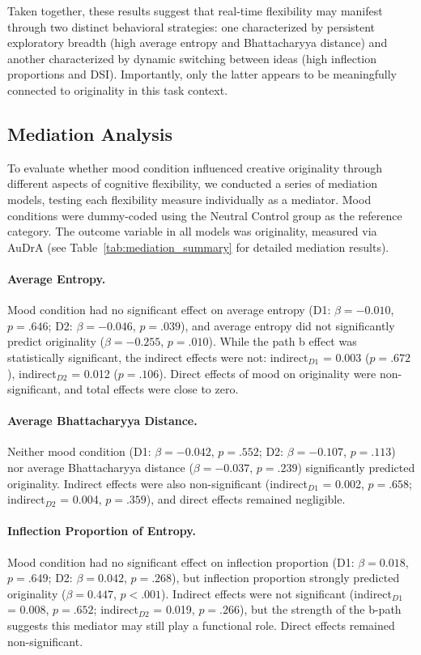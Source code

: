 \documentclass[../MA_Thesis.tex]{subfiles}
\begin{document}
Taken together, these results suggest that real-time flexibility may manifest through two distinct behavioral strategies: one characterized by persistent exploratory breadth (high average entropy and Bhattacharyya distance) and another characterized by dynamic switching between ideas (high inflection proportions and DSI). Importantly, only the latter appears to be meaningfully connected to originality in this task context.

\subsection*{Mediation Analysis}

To evaluate whether mood condition influenced creative originality through different aspects of cognitive flexibility, we conducted a series of mediation models, testing each flexibility measure individually as a mediator. Mood conditions were dummy-coded using the Neutral Control group as the reference category. The outcome variable in all models was originality, measured via AuDrA (see Table~\ref{tab:mediation_summary} for detailed mediation results).

\paragraph{Average Entropy.}
Mood condition had no significant effect on average entropy (D1: $\beta = -0.010$, $p = .646$; D2: $\beta = -0.046$, $p = .039$), and average entropy did not significantly predict originality ($\beta = -0.255$, $p = .010$). While the path b effect was statistically significant, the indirect effects were not: indirect$_{D1}$ = 0.003 ($p = .672$), indirect$_{D2}$ = 0.012 ($p = .106$). Direct effects of mood on originality were non-significant, and total effects were close to zero.

\paragraph{Average Bhattacharyya Distance.}
Neither mood condition (D1: $\beta = -0.042$, $p = .552$; D2: $\beta = -0.107$, $p = .113$) nor average Bhattacharyya distance ($\beta = -0.037$, $p = .239$) significantly predicted originality. Indirect effects were also non-significant (indirect$_{D1}$ = 0.002, $p = .658$; indirect$_{D2}$ = 0.004, $p = .359$), and direct effects remained negligible.

\paragraph{Inflection Proportion of Entropy.}
Mood condition had no significant effect on inflection proportion (D1: $\beta = 0.018$, $p = .649$; D2: $\beta = 0.042$, $p = .268$), but inflection proportion strongly predicted originality ($\beta = 0.447$, $p < .001$). Indirect effects were not significant (indirect$_{D1}$ = 0.008, $p = .652$; indirect$_{D2}$ = 0.019, $p = .266$), but the strength of the b-path suggests this mediator may still play a functional role. Direct effects remained non-significant.
\end{document}
